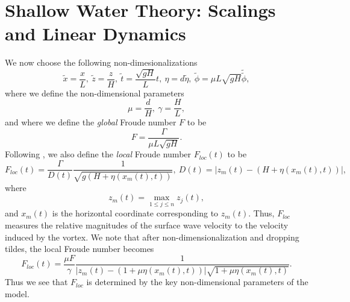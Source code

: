 \documentclass[a4paper,11pt]{article}
\begin{document}
\section{Shallow Water Theory: Scalings and Linear Dynamics}
We now choose the following non-dimesionalizations 
\[
\tilde{x} = \frac{x}{L}, ~\tilde{z} = \frac{z}{H}, ~ \tilde{t} = \frac{\sqrt{gH}}{L} t, ~ \eta = d\tilde{\eta}, ~ \tilde{\phi} = \mu L\sqrt{gH} \tilde{\tilde{\phi}},
\]
where we define the non-dimensional parameters
\[
\mu= \frac{d}{H}, ~ \gamma = \frac{H}{L},
\]
and where we define the {\it global} Froude number $F$ to be 
\[
F = \frac{\Gamma}{\mu L \sqrt{gH}}.
\]
Following \cite{tyvand1}, we also define the {\it local} Froude number $F_{loc}(t)$ to be 
\[
F_{loc}(t) = \frac{\Gamma}{D(t)}\frac{1}{\sqrt{g(H+\eta(x_{m}(t),t))}}, ~ D(t) = \left|z_{m}(t) - (H+\eta(x_{m}(t),t))  \right|,
\]  
where 
\[
z_{m}(t) = \max_{1\leq j\leq n} z_{j}(t),
\]
and $x_{m}(t)$ is the horizontal coordinate corresponding to $z_{m}(t)$.  Thus, $F_{loc}$ measures the relative magnitudes of the surface wave velocity to the velocity induced by the vortex.  We note that after non-dimensionalization and dropping tildes, the local Froude number becomes 
\[
F_{loc}(t) = \frac{\mu F}{\gamma}\frac{1}{\left|z_{m}(t)-(1+\mu\eta(x_{m}(t),t)) \right|\sqrt{1+\mu\eta(x_{m}(t),t)}}.
\]
Thus we see that $F_{loc}$ is determined by the key non-dimensional parameters of the model.
\end{document}
